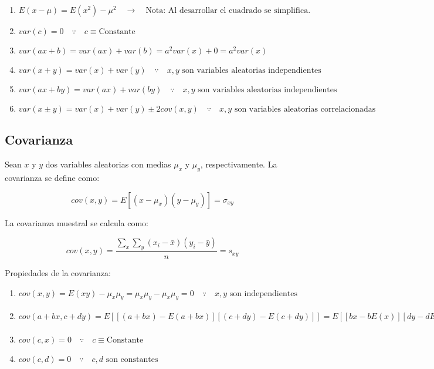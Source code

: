 \documentclass[
]{book}
\providecommand{\tightlist}{%
  \setlength{\itemsep}{0pt}\setlength{\parskip}{0pt}}
\begin{document}
\begin{enumerate}
\def\labelenumi{\arabic{enumi}.}
\tightlist
\item
  \(E(x-\mu) = E(x^2) - \mu^2 \quad \rightarrow \quad \text{Nota: Al desarrollar el cuadrado se simplifica.}\)
\item
  \(var(c)=0 \quad \because \quad c \equiv \text{Constante}\)
\item
  \(var(ax + b) = var(ax) + var(b) = a^2 var(x) + 0 = a^2 var(x)\)
\item
  \(var(x+y) = var(x) + var(y) \quad \because \quad x,y \text{ son variables aleatorias independientes}\)
\item
  \(var(ax + by) = var(ax) + var(by) \quad \because \quad x,y \text{ son variables aleatorias independientes}\)
\item
  \(var(x \pm y) = var(x) + var(y) \pm 2cov(x,y) \quad \because \quad x,y \text{ son variables aleatorias correlacionadas}\)
\end{enumerate}

\hypertarget{covarianza}{%
\subsection{Covarianza}\label{covarianza}}

Sean \(x\) y \(y\) dos variables aleatorias con medias \(\mu_x\) y \(\mu_y\), respectivamente. La covarianza se define como:

\[
cov(x,y) = E[(x-\mu_x)(y-\mu_y)] = \sigma_{xy}
\]

La covarianza muestral se calcula como:

\[
cov(x,y) = \frac{\sum_x \sum_y (x_i - \bar x)(y_i - \bar y)}{n} = s_{xy}
\]

Propiedades de la covarianza:

\begin{enumerate}
\def\labelenumi{\arabic{enumi}.}
\tightlist
\item
  \(cov(x,y) = E(xy) - \mu_x \mu_y = \mu_x \mu_y - \mu_x \mu_y = 0 \quad \because \quad x,y \text{ son independientes}\)
\item
  \(cov(a+bx, c+dy) = E\left[ \left[(a+bx) - E(a+bx)\right]\left[(c+dy) - E(c+dy)\right] \right] = E\left[ \left[ bx - bE(x) \right]\left[ dy - dE(y) \right] \right] = bd \, E\left[(x-\mu_{x})(y-\mu_{y})\right] = bd \, cov(x, y)\)
\item
  \(cov(c,x) = 0 \quad \because \quad c \equiv \text{Constante}\)
\item
  \(cov(c,d) = 0 \quad \because \quad c,d \text{ son constantes}\)
\end{enumerate}
\end{document}
